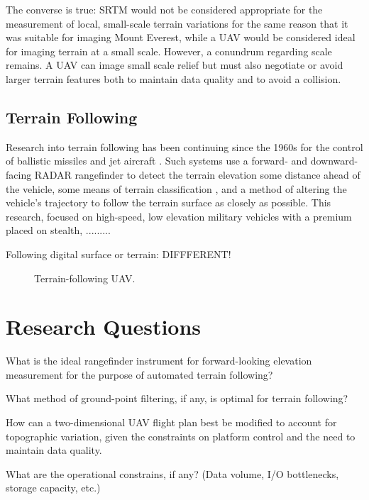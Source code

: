 \documentclass[10pt,a4paper]{report}
\begin{document}
The converse is true: SRTM would not be considered appropriate for the measurement of local, small-scale terrain variations for the same reason that it was suitable for imaging Mount Everest, while a UAV would be considered ideal for imaging terrain at a small scale. However, a conundrum regarding scale remains. A UAV can image small scale relief but must also negotiate or avoid larger terrain features both to maintain data quality and to avoid a collision.


\subsection{Terrain Following}

Research into terrain following has been continuing since the 1960s for the control of ballistic missiles and jet aircraft \cite{KRACHMALNICK1968,Starling1971,Cunningham1980}. Such systems use a forward- and downward-facing RADAR rangefinder to detect the terrain elevation some distance ahead of the vehicle, some means of terrain classification \cite{Cunningham1980}, and a method of altering the vehicle's trajectory to follow the terrain surface as closely as possible. This research, focused on high-speed, low elevation military vehicles with a premium placed on stealth, .........

Following digital surface or terrain: DIFFFERENT!

\begin{figure}
\centering
\def\svgscale{0.5}

\caption{Terrain-following UAV.}
\label{fig:uav_terrain}
\end{figure}

\section{Research Questions}

What is the ideal rangefinder instrument for forward-looking elevation measurement for the purpose of automated terrain following?

What method of ground-point filtering, if any, is optimal for terrain following?

How can a two-dimensional UAV flight plan best be modified to account for topographic variation, given the constraints on platform control and the need to maintain data quality.

What are the operational constrains, if any? (Data volume, I/O bottlenecks, storage capacity, etc.)
\end{document}

